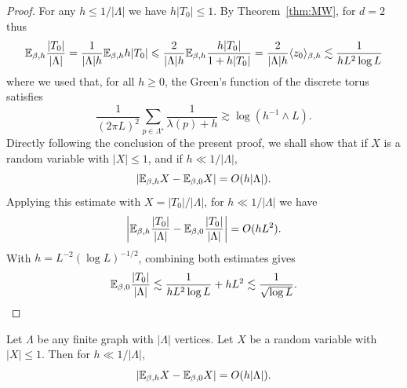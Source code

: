 \documentclass[11pt]{amsart}
\numberwithin{equation}{section}
\numberwithin{theorem}{section}
\begin{document}
\begin{proof}
For any $h \leq 1/|\Lambda|$ we have $h|T_0| \leq 1$.
By Theorem~\ref{thm:MW}, for $d=2$ thus
\begin{equation}
  \mathbb{E}_{\beta,h} \frac{|T_0|}{|\Lambda|}
  =
  \frac{1}{|\Lambda|h} \mathbb{E}_{\beta,h} h|T_0|
  \leqslant
  \frac{2}{|\Lambda|h} \mathbb{E}_{\beta,h} \frac{h|T_0|}{1+h|T_0|}
  =
  \frac{2}{|\Lambda|h} \langle z_0 \rangle_{\beta,h}
  \lesssim
  \frac{1}{h L^2 \log L}
\end{equation}
where we used 
that, for all $h \geq 0$, the Green's function of the discrete torus satisfies
\begin{equation} \label{e:gfbd}
  \frac{1}{(2\pi L)^2} \sum_{p \in \Lambda^{\star}} \frac{1}{\lambda(p) + h}
  \gtrsim \log (h^{-1}\wedge L).
\end{equation}
Directly following the conclusion of the present proof, we shall show that if $X$ is a random variable with $|X|\leq 1$,
and if $h \ll 1/|\Lambda|$,
\begin{equation} \label{e:EhE0bd}
  \left\lvert \mathbb{E}_{\beta,h} X -  \mathbb{E}_{\beta,0} X \right\rvert = O(h|\Lambda|).
\end{equation}
Applying this estimate with $X=|T_0|/|\Lambda|$, for $h \ll 1/|\Lambda|$ we have
\begin{equation} \label{e:EhE0bd}
  \left\lvert 
    \mathbb{E}_{\beta,h} \frac{|T_0|}{|\Lambda|} -
    \mathbb{E}_{\beta,0} \frac{|T_0|}{|\Lambda|}
   \right\rvert
  = O(hL^2).
\end{equation}
With $h =L^{-2}(\log L)^{-1/2}$, combining both estimates gives
\begin{equation}
  \mathbb{E}_{\beta,0} \frac{|T_0|}{|\Lambda|}
  \lesssim \frac{1}{hL^2 \log L} + h L^2
  \lesssim \frac{1}{\sqrt{\log L}}  .
  \qedhere
\end{equation}
\end{proof}


\begin{lemma}
Let $\Lambda$ be any finite graph with $|\Lambda|$ vertices.
Let $X$ be a random variable with $|X|\leq 1$.
Then for $h \ll 1/|\Lambda|$,
\begin{equation} \label{e:EhE0bd}
  \left\lvert \mathbb{E}_{\beta,h} X -  \mathbb{E}_{\beta,0} X \right\rvert = O(h|\Lambda|).
\end{equation}
\end{lemma}
\end{document}
